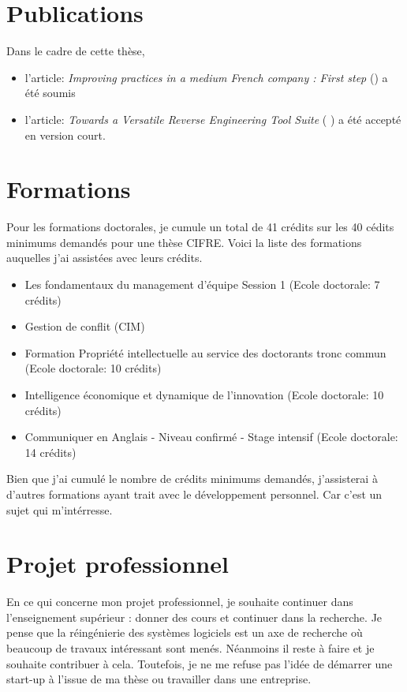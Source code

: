 \documentclass[a4paper]{article}
\begin{document}
\section{Publications}
Dans le cadre de cette thèse,
\begin{itemize}
\item l'article: \textit{Improving practices in a medium French company : First step} (\citet{Houe20a}) a été soumis
\item l'article: \textit{Towards a Versatile Reverse Engineering Tool Suite}  ( \citet{Houe20b}) a été accepté en version court.
\end{itemize}



\section{Formations}
Pour les formations doctorales, je cumule un  total de 41 crédits sur les 40 cédits minimums demandés pour une thèse CIFRE. 
Voici la liste des formations auquelles j'ai assistées  avec leurs crédits.
\begin{itemize}
\item Les fondamentaux du management d’équipe Session 1 (Ecole doctorale: 7 crédits) 
\item Gestion de conflit (CIM) 
\item Formation Propriété intellectuelle au service des doctorants tronc commun (Ecole doctorale: 10 crédits)
\item Intelligence économique et dynamique de l'innovation (Ecole doctorale: 10 crédits)
\item Communiquer en Anglais - Niveau confirmé - Stage intensif (Ecole doctorale: 14 crédits)
\end{itemize}
Bien que j'ai cumulé le nombre de crédits minimums demandés, j'assisterai à d'autres formations ayant trait avec le développement personnel. 
Car c'est un sujet qui m'intérresse.
\section{Projet professionnel}
En ce qui concerne mon projet professionnel, je souhaite continuer dans l'enseignement supérieur : donner des cours et continuer dans la recherche.
Je pense que  la réingénierie des systèmes logiciels est un axe de recherche où beaucoup de travaux intéressant sont menés. Néanmoins il reste à faire et je souhaite contribuer à cela.
Toutefois, je ne me refuse pas l'idée de démarrer une start-up à l'issue de ma thèse ou travailler dans une entreprise.

\footnotesize{
 

}
\end{document}
